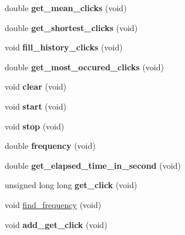 \begin{DoxyCompactItemize}
double {\bfseries get\+\_\+mean\+\_\+clicks} (void)
\item 
\mbox{\label{class_x86___timer_a6631a74c2fe9fd5f58ddc2bf1d924c51}} 
double {\bfseries get\+\_\+shortest\+\_\+clicks} (void)
\item 
\mbox{\label{class_x86___timer_ae0bdf9ea9f1bd65b1e5d6fb4ad0c4e31}} 
void {\bfseries fill\+\_\+history\+\_\+clicks} (void)
\item 
\mbox{\label{class_x86___timer_aaf06db4cf233ad033b106bd6d68d3d10}} 
double {\bfseries get\+\_\+most\+\_\+occured\+\_\+clicks} (void)
\item 
\mbox{\label{class_x86___timer_ab5e6034aa0fdeee8f9073f24193d9ff5}} 
void {\bfseries clear} (void)
\item 
\mbox{\label{class_x86___timer_a90050edc326c78c5e1322a17d2602af9}} 
void {\bfseries start} (void)
\item 
\mbox{\label{class_x86___timer_ab1b153b8e942f23d6ff809ed30d348cc}} 
void {\bfseries stop} (void)
\item 
\mbox{\label{class_x86___timer_ab46d07feea13b7846a4b1f5a92dbf1f7}} 
double {\bfseries frequency} (void)
\item 
\mbox{\label{class_x86___timer_a69dd9817f6f3e2cc165d981bc778ce33}} 
double {\bfseries get\+\_\+elapsed\+\_\+time\+\_\+in\+\_\+second} (void)
\item 
\mbox{\label{class_x86___timer_a3f6ad78024b1403e4ce0a6dec2164963}} 
unsigned long long {\bfseries get\+\_\+click} (void)
\item 
void \hyperlink{class_x86___timer_a1beddd8cb10ed89d3dd06d3b233b63e1}{find\+\_\+frequency} (void)
\item 
\mbox{\label{class_x86___timer_a3863c016a3154c33caaadf7886e53079}} 
void {\bfseries add\+\_\+get\+\_\+click} (void)
\item 
\mbox{\label{class_x86___timer_a6c602580635e29c5dca9a67272901193}} 

\end{DoxyCompactItemize}
